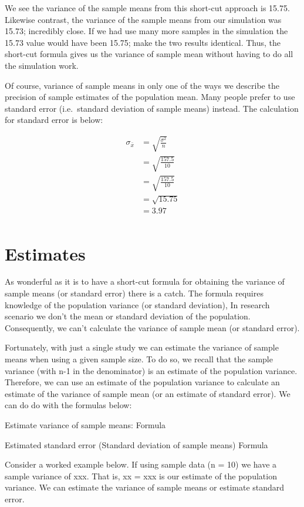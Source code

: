 \documentclass[
]{krantz}
\begin{document}
We see the variance of the sample means from this short-cut approach is 15.75. Likewise contrast, the variance of the sample means from our simulation was 15.73; incredibly close. If we had use many more samples in the simulation the 15.73 value would have been 15.75; make the two results identical. Thus, the short-cut formula gives us the variance of sample mean without having to do all the simulation work.

Of course, variance of sample means in only one of the ways we describe the precision of sample estimates of the population mean. Many people prefer to use standard error (i.e.~standard deviation of sample means) instead. The calculation for standard error is below:

\[
\begin{aligned} 
\sigma_{\bar{x}} &= \sqrt{\frac{\sigma^2}{n}} \\
&= \sqrt{\frac{157.5}{10}}\\
&= \sqrt{\frac{157.5}{10}}\\
&= \sqrt{15.75} \\
&= 3.97 \\
\end{aligned} 
\]

\hypertarget{estimates}{%
\section{Estimates}\label{estimates}}

As wonderful as it is to have a short-cut formula for obtaining the variance of sample means (or standard error) there is a catch. The formula requires knowledge of the population variance (or standard deviation), In research scenario we don't the mean or standard deviation of the population. Consequently, we can't calculate the variance of sample mean (or standard error).

Fortunately, with just a single study we can estimate the variance of sample means when using a given sample size. To do so, we recall that the sample variance (with n-1 in the denominator) is an estimate of the population variance. Therefore, we can use an estimate of the population variance to calculate an estimate of the variance of sample mean (or an estimate of standard error). We can do do with the formulas below:

Estimate variance of sample means:
Formula

Estimated standard error (Standard deviation of sample means)
Formula

Consider a worked example below. If using sample data (n = 10) we have a sample variance of xxx. That is, xx = xxx is our estimate of the population variance. We can estimate the variance of sample means or estimate standard error.
\end{document}
